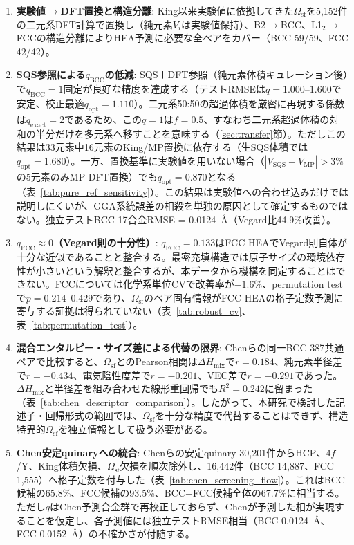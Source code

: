 \documentclass[5p,10pt]{elsarticle}
\begin{document}
\begin{enumerate}
  \item \textbf{実験値$\to$DFT置換と構造分離}:
    King以来実験値に依拠してきた$\Omega_\text{sf}$を5,152件の二元系DFT計算で置換し（純元素$V_i$は実験値保持）、B2$\to$BCC、L1$_2$$\to$FCCの構造分離によりHEA予測に必要な全ペアをカバー（BCC 59/59、FCC 42/42）。

  \item \textbf{SQS参照による$q_\text{BCC}$の低減}:
    SQS＋DFT参照（純元素体積キュレーション後）で$q_\text{BCC} = 1$固定が良好な精度を達成する（テストRMSEは$q = 1.000$--$1.600$で安定、校正最適$q_\text{opt} = 1.110$）。二元系50:50の超過体積を厳密に再現する係数は$q_\text{exact}=2$であるため、この$q=1$は$f=0.5$、すなわち二元系超過体積の対和の半分だけを多元系へ移すことを意味する（\ref{sec:transfer}節）。ただしこの結果は33元素中16元素のKing/MP置換に依存する（生SQS体積では$q_\text{opt} = 1.680$）。一方、置換基準に実験値を用いない場合（$|V_\text{SQS}-V_\text{MP}|>3\%$の5元素のみMP-DFT置換）でも$q_\text{opt} = 0.870$となる（表~\ref{tab:pure_ref_sensitivity}）。この結果は実験値への合わせ込みだけでは説明しにくいが、GGA系統誤差の相殺を単独の原因として確定するものではない。独立テストBCC 17合金RMSE = 0.0124~\AA{}（Vegard比44.9\%改善）。

  \item \textbf{$q_\text{FCC} \approx 0$（Vegard則の十分性）}:
    $q_\text{FCC} = 0.133$はFCC HEAでVegard則自体が十分な近似であることと整合する。最密充填構造では原子サイズの環境依存性が小さいという解釈と整合するが、本データから機構を同定することはできない。FCCについては化学系単位CVで改善率が$-1.6\%$、permutation testで$p = 0.214$--$0.429$であり、$\Omega_\text{sf}$のペア固有情報がFCC HEAの格子定数予測に寄与する証拠は得られていない（表~\ref{tab:robust_cv}、表~\ref{tab:permutation_test}）。

  \item \textbf{混合エンタルピー・サイズ差による代替の限界}:
    Chenらの同一BCC 387共通ペアで比較すると、$\Omega_\text{sf}$とのPearson相関は$\Delta H_\text{mix}$で$r=0.184$、純元素半径差で$r=-0.434$、電気陰性度差で$r=-0.201$、VEC差で$r=-0.291$であった。$\Delta H_\text{mix}$と半径差を組み合わせた線形重回帰でも$R^2=0.242$に留まった（表~\ref{tab:chen_descriptor_comparison}）。したがって、本研究で検討した記述子・回帰形式の範囲では、$\Omega_\text{sf}$を十分な精度で代替することはできず、構造特異的$\Omega_\text{sf}$を独立情報として扱う必要がある。

  \item \textbf{Chen安定quinaryへの統合}:
    Chenらの安定quinary 30,201件からHCP、4$f$/Y、King体積欠損、$\Omega_\text{sf}$欠損を順次除外し、16,442件（BCC 14,887、FCC 1,555）へ格子定数を付与した（表~\ref{tab:chen_screening_flow}）。これはBCC候補の65.8\%、FCC候補の93.5\%、BCC+FCC候補全体の67.7\%に相当する。ただし$q$はChen予測合金群で再校正しておらず、Chenが予測した相が実現することを仮定し、各予測値には独立テストRMSE相当（BCC 0.0124~\AA{}、FCC 0.0152~\AA{}）の不確かさが付随する。


\end{enumerate}
\end{document}
